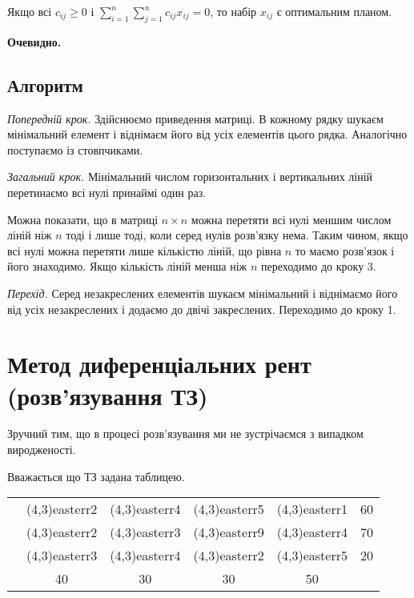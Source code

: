 \documentclass[12pt,a4paper]{book}
\newcommand{\diagcell}[4]{\diaghead({#1},{#2}){easterr}{#4}{#3}}
\newenvironment{slim_enumerate}{
\begin{enumerate}
  \setlength{\itemsep}{1pt}
  \setlength{\parskip}{0pt}
  \setlength{\parsep}{0pt}}
{\end{enumerate}}
\begin{document}
Якщо всі $c_{ij} \geq 0$ і $ \sum_{i=1}^n \sum_{j=1}^n c_{ij} x_{ij} = 0$, то набір $x_{ij}$ є оптимальним планом.

{\bf Очевидно.}

\subsection{Алгоритм}

\begin{slim_enumerate}
  \item {\it Попередній крок.} Здійснюємо приведення матриці. В кожному рядку шукаєм мінімальний елемент і віднімаєм його від усіх елементів цього рядка. Аналогічно поступаємо із стовпчиками.
  \item {\it Загальний крок.} Мінімальний числом горизонтальних і вертикальних ліній перетинаємо всі нулі принаймі один раз.

Можна показати, що в матриці $n \times n$ можна перетяти всі нулі меншим числом ліній ніж $n$ тоді і лише тоді, коли серед нулів розв’язку нема. Таким чином, якщо всі нулі можна перетяти лише кількістю ліній, що рівна $n$ то маємо розв’язок і його знаходимо. Якщо кількість ліній менша ніж $n$ переходимо до кроку 3.

  \item {\it Перехід.} Серед незакреслених елементів шукаєм мінімальний і віднімаємо його від усіх незакреслених і додаємо до двічі закреслених. Переходимо до кроку 1.
\end{slim_enumerate}

\section{Метод диференціальних рент (розв’язування ТЗ)}

Зручний тим, що в процесі розв’язування ми не зустрічаємся з випадком виродженості.

Вважається що ТЗ задана таблицею.\\
\begin{tabular}{ | c | c | c | c | c | c | }
\hline
	&		&		&		&		&\\
\hline
	&	\diagcell{4}{3}{}{2}	&	\diagcell{4}{3}{}{4}	&	\diagcell{4}{3}{}{5}	&	\diagcell{4}{3}{}{1}	&	60\\
\hline
	&	\diagcell{4}{3}{}{2}	&	\diagcell{4}{3}{}{3}	&	\diagcell{4}{3}{}{9}	&	\diagcell{4}{3}{}{4}	&	70\\
\hline
	&	\diagcell{4}{3}{}{3}	&	\diagcell{4}{3}{}{4}	&	\diagcell{4}{3}{}{2}	&	\diagcell{4}{3}{}{5}	&	20\\
\hline
	&	40	&	30	&	30	&	50	&\\
\hline
\end{tabular}
\end{document}
